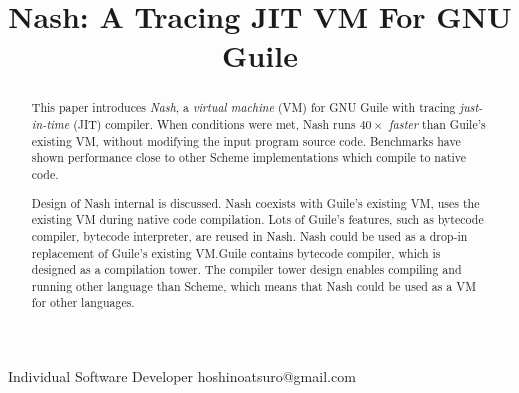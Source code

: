 \documentclass[preprint, 10pt]{sigplanconf}
\begin{document}
\setlength{\pdfpageheight}{\paperheight}
\setlength{\pdfpagewidth}{\paperwidth}




\title{Nash: A Tracing JIT VM For GNU Guile}

           {Individual Software Developer}
           {hoshinoatsuro@gmail.com}

\maketitle

\begin{abstract}

This paper introduces \textit{Nash}, a \textit{virtual machine} (VM) for GNU
Guile with tracing \textit{just-in-time} (JIT) compiler. When conditions were
met, Nash runs \textit{$40\times$ faster} than Guile's existing VM, without
modifying the input program source code. Benchmarks have shown performance close
to other Scheme implementations which compile to native code.


Design of Nash internal is discussed. Nash coexists with Guile's existing VM,
uses the existing VM during native code compilation. Lots of Guile's features,
such as bytecode compiler, bytecode interpreter, are reused in Nash. Nash could
be used as a drop-in replacement of Guile's existing VM.\@ Guile contains
bytecode compiler, which is designed as a compilation tower. The compiler tower
design enables compiling and running other language than Scheme, which means
that Nash could be used as a VM for other languages.
\end{abstract}

\end{document}
